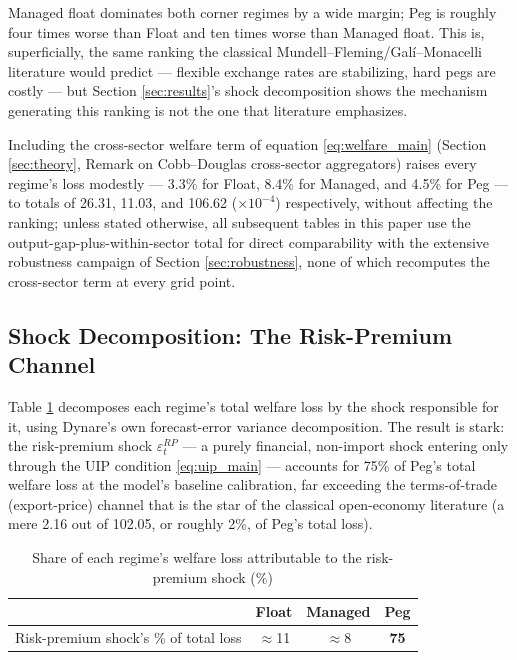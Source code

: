 \documentclass[12pt]{article}
\begin{document}
Managed float dominates both corner regimes by a wide margin; Peg is roughly four times worse than
Float and ten times worse than Managed float. This is, superficially, the same ranking the classical
Mundell--Fleming/Gal\'i--Monacelli literature would predict --- flexible exchange rates are
stabilizing, hard pegs are costly --- but Section \ref{sec:results}'s shock decomposition shows the
mechanism generating this ranking is not the one that literature emphasizes.

Including the cross-sector welfare term of equation \eqref{eq:welfare_main} (Section \ref{sec:theory},
Remark on Cobb--Douglas cross-sector aggregators) raises every regime's loss modestly ---
3.3\% for Float, 8.4\% for Managed, and 4.5\% for Peg --- to totals of 26.31, 11.03, and 106.62
($\times10^{-4}$) respectively, without affecting the ranking; unless stated otherwise, all
subsequent tables in this paper use the output-gap-plus-within-sector total for direct comparability
with the extensive robustness campaign of Section \ref{sec:robustness}, none of which recomputes the
cross-sector term at every grid point.

\subsection{Shock Decomposition: The Risk-Premium Channel}
\label{sec:shock_decomp}

Table \ref{tab:shock_decomp} decomposes each regime's total welfare loss by the shock responsible for
it, using Dynare's own forecast-error variance decomposition. The result is stark: the risk-premium
shock $\varepsilon^{RP}_t$ --- a purely financial, non-import shock entering only through the UIP
condition \eqref{eq:uip_main} --- accounts for 75\% of Peg's total welfare loss at the model's
baseline calibration, far exceeding the terms-of-trade (export-price) channel that is the star of the
classical open-economy literature (a mere 2.16 out of 102.05, or roughly 2\%, of Peg's total loss).

\begin{table}[H]
\centering
\caption{Share of each regime's welfare loss attributable to the risk-premium shock ($\%$)}
\label{tab:shock_decomp}
\begin{tabular}{lccc}
\toprule
 & Float & Managed & Peg \\
\midrule
Risk-premium shock's \% of total loss & $\approx$11 & $\approx$8 & \textbf{75} \\
\bottomrule
\end{tabular}
\end{table}
\end{document}
